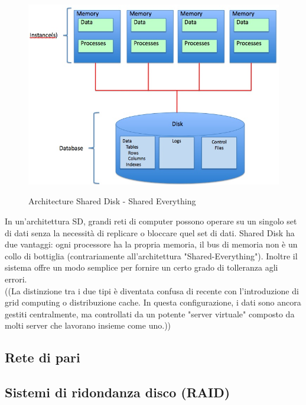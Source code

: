 \begin{figure}[htbp]
\centering
\includegraphics[scale=0.40]{img/Shared_Disk_Architecture.jpg}\\
\caption{Architecture Shared Disk - Shared Everything \label{figura1.2} \cite{etichetta7}}
\end{figure}

In un'architettura SD, grandi reti di computer possono operare su un singolo set di dati senza la necessit\`{a} di replicare o bloccare quel set di dati.\cite{etichetta7}
Shared Disk ha due vantaggi: ogni processore ha la propria memoria, il bus di memoria non \`{e} un collo di bottiglia (contrariamente all'architettura "Shared-Everything"). Inoltre il sistema offre un modo semplice per fornire un certo grado di tolleranza agli errori.\\

((La distinzione tra i due tipi \`{e} diventata confusa di recente con l'introduzione di grid computing o distribuzione cache. In questa configurazione, i dati sono ancora gestiti centralmente, ma controllati da un potente "server virtuale" composto da molti server che lavorano insieme come uno.\cite{etichetta2}))
\item
\subsection{Rete di pari}
\item
\subsection{Sistemi di ridondanza disco (RAID)}
\item
